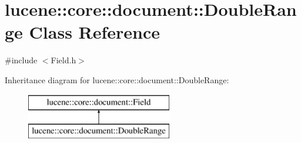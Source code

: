 \hypertarget{classlucene_1_1core_1_1document_1_1DoubleRange}{}\section{lucene\+:\+:core\+:\+:document\+:\+:Double\+Range Class Reference}
\label{classlucene_1_1core_1_1document_1_1DoubleRange}


{\ttfamily \#include $<$Field.\+h$>$}

Inheritance diagram for lucene\+:\+:core\+:\+:document\+:\+:Double\+Range\+:\begin{figure}[H]
\begin{center}
\leavevmode
\includegraphics[height=2.000000cm]{classlucene_1_1core_1_1document_1_1DoubleRange}
\end{center}
\end{figure}
